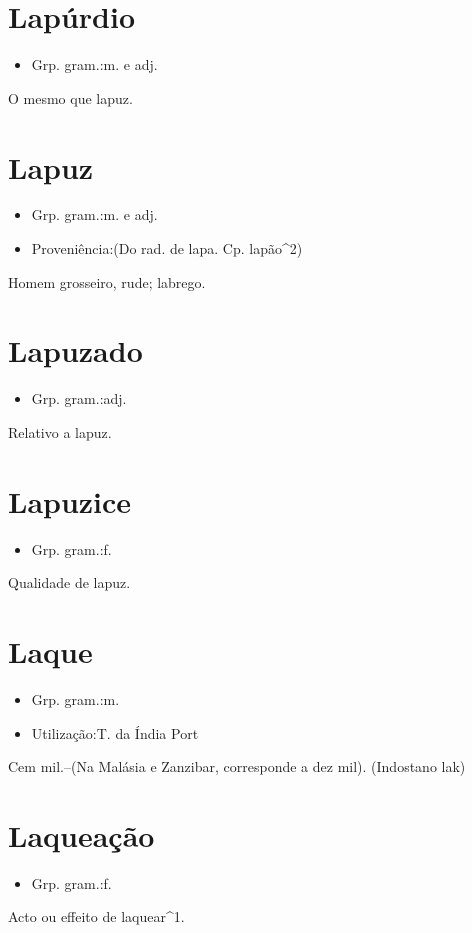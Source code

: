 \section{Lapúrdio}
\begin{itemize}
\item {Grp. gram.:m.  e  adj.}
\end{itemize}
O mesmo que \textunderscore lapuz\textunderscore .
\section{Lapuz}
\begin{itemize}
\item {Grp. gram.:m.  e  adj.}
\end{itemize}
\begin{itemize}
\item {Proveniência:(Do rad. de \textunderscore lapa\textunderscore . Cp. \textunderscore lapão\textunderscore ^2)}
\end{itemize}
Homem grosseiro, rude; labrego.
\section{Lapuzado}
\begin{itemize}
\item {Grp. gram.:adj.}
\end{itemize}
Relativo a lapuz.
\section{Lapuzice}
\begin{itemize}
\item {Grp. gram.:f.}
\end{itemize}
Qualidade de lapuz.
\section{Laque}
\begin{itemize}
\item {Grp. gram.:m.}
\end{itemize}
\begin{itemize}
\item {Utilização:T. da Índia Port}
\end{itemize}
Cem mil.--(Na Malásia e Zanzibar, corresponde a dez mil).
(Indostano \textunderscore lak\textunderscore )
\section{Laqueação}
\begin{itemize}
\item {Grp. gram.:f.}
\end{itemize}
Acto ou effeito de laquear^1.
